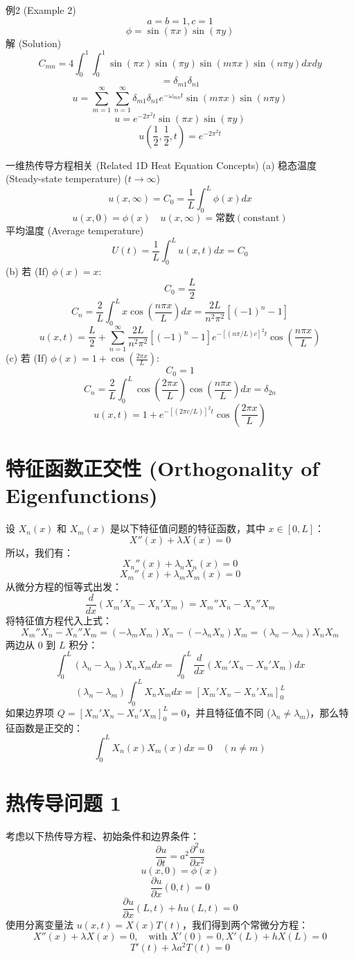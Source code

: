 \documentclass{article}
\begin{document}
	例2 (Example 2)
	$$
	a=b=1, c=1
	$$
	$$
	\phi = \sin(\pi x) \sin(\pi y)
	$$
	解 (Solution)
	$$
	C_{mn} = 4 \int_0^1 \int_0^1 \sin(\pi x)\sin(\pi y) \sin(m\pi x)\sin(n\pi y) dx dy
	$$
	$$
	= \delta_{m1} \delta_{n1}
	$$
	$$
	u = \sum_{m=1}^{\infty} \sum_{n=1}^{\infty} \delta_{m1} \delta_{n1} e^{-\omega_{mn}t} \sin(m\pi x)\sin(n\pi y)
	$$
	$$
	u = e^{-2\pi^2 t} \sin(\pi x)\sin(\pi y)
	$$
	$$
	u(\frac{1}{2}, \frac{1}{2}, t) = e^{-2\pi^2 t}
	$$
	
	一维热传导方程相关 (Related 1D Heat Equation Concepts)
	(a) 稳态温度 (Steady-state temperature) ($t \to \infty$)
	$$
	u(x, \infty) = C_0 = \frac{1}{L} \int_0^L \phi(x) dx
	$$
	$$
	u(x, 0) = \phi(x) \quad u(x, \infty) = \text{常数} (\text{constant})
	$$
	平均温度 (Average temperature)
	$$
	U(t) = \frac{1}{L} \int_0^L u(x,t) dx = C_0
	$$
	(b) 若 (If) $\phi(x)=x$:
	$$
	C_0 = \frac{L}{2}
	$$
	$$
	C_n = \frac{2}{L} \int_0^L x \cos(\frac{n\pi x}{L}) dx = \frac{2L}{n^2\pi^2}[(-1)^n - 1]
	$$
	$$
	u(x,t) = \frac{L}{2} + \sum_{n=1}^{\infty} \frac{2L}{n^2\pi^2}[(-1)^n - 1] e^{-[ (n\pi/L)c ]^2 t} \cos(\frac{n\pi x}{L})
	$$
	(c) 若 (If) $\phi(x) = 1 + \cos(\frac{2\pi x}{L})$:
	$$
	C_0 = 1
	$$
	$$
	C_n = \frac{2}{L} \int_0^L \cos(\frac{2\pi x}{L}) \cos(\frac{n\pi x}{L}) dx = \delta_{2n}
	$$
	$$
	u(x,t) = 1 + e^{-[ (2\pi c/L) ]^2 t} \cos(\frac{2\pi x}{L})
	$$
	
	\section*{特征函数正交性 (Orthogonality of Eigenfunctions)}
	设 $X_n(x)$ 和 $X_m(x)$ 是以下特征值问题的特征函数，其中 $x \in [0, L]$：
	$$ X''(x) + \lambda X(x) = 0 $$
	所以，我们有：
	$$ X_n''(x) + \lambda_n X_n(x) = 0 $$
	$$ X_m''(x) + \lambda_m X_m(x) = 0 $$
	从微分方程的恒等式出发：
	$$ \frac{d}{dx}(X_m' X_n - X_n' X_m) = X_m'' X_n - X_n'' X_m $$
	将特征值方程代入上式：
	$$ X_m'' X_n - X_n'' X_m = (-\lambda_m X_m) X_n - (-\lambda_n X_n) X_m = (\lambda_n - \lambda_m) X_n X_m $$
	两边从 $0$ 到 $L$ 积分：
	$$ \int_0^L (\lambda_n - \lambda_m) X_n X_m dx = \int_0^L \frac{d}{dx}(X_m' X_n - X_n' X_m) dx $$
	$$ (\lambda_n - \lambda_m) \int_0^L X_n X_m dx = [X_m' X_n - X_n' X_m]_0^L $$
	如果边界项 $Q = [X_m' X_n - X_n' X_m]_0^L = 0$，并且特征值不同 ($\lambda_n \neq \lambda_m$)，那么特征函数是正交的：
	$$ \int_0^L X_n(x) X_m(x) dx = 0 \quad (n \neq m) $$
	
	\section*{热传导问题 1}
	考虑以下热传导方程、初始条件和边界条件：
	$$ \frac{\partial u}{\partial t} = a^2 \frac{\partial^2 u}{\partial x^2} $$
	$$ u(x,0) = \phi(x) $$
	$$ \frac{\partial u}{\partial x}(0,t) = 0 $$
	$$ \frac{\partial u}{\partial x}(L,t) + h u(L,t) = 0 $$
	使用分离变量法 $u(x,t) = X(x)T(t)$，我们得到两个常微分方程：
	$$ X''(x) + \lambda X(x) = 0, \quad \text{with } X'(0)=0, X'(L)+hX(L)=0 $$
	$$ T'(t) + \lambda a^2 T(t) = 0 $$
	
\end{document}
